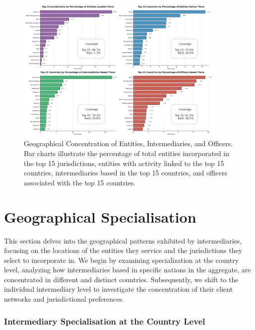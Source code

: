 \begin{figure}[htbp]
    \centering
    \includegraphics[width=0.9\textwidth]{images/Preliminary_Geography_Overview.png} 
    \caption{Geographical Concentration of Entities, Intermediaries, and Officers. Bar charts illustrate the percentage of total entities incorporated in the top 15 jurisdictions, entities with activity linked to the top 15 countries, intermediaries based in the top 15 countries, and officers associated with the top 15 countries.}
    \label{fig:preliminary_geography_overview}
\end{figure}

\section{Geographical Specialisation}
\label{sec:geographical_specialisation}

This section delves into the geographical patterns exhibited by intermediaries, focusing on the locations of the entities they service and the jurisdictions they select to incorporate in. We begin by examining specialization at the country level, analyzing how intermediaries based in specific nations in the aggregate, are concentrated in different and distinct countries. Subsequently, we shift to the individual intermediary level to investigate the concentration of their client networks and jurisdictional preferences.

\subsubsection{Intermediary Specialisation at the Country Level}
\label{subsubsec:intermediary_specialisation_country}

